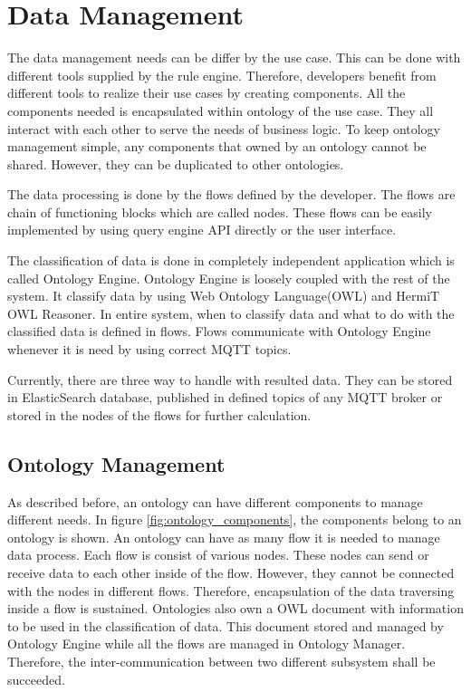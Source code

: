 \chapter{Data Management}\label{chapter:data_management}


The data management needs can be differ by the use case. This can be done with different tools supplied by the rule engine. Therefore, developers benefit from different tools to realize their use cases by creating components. All the components needed is encapsulated within ontology of the use case. They all interact with each other to serve the needs of business logic. To keep ontology management simple, any components that owned by an ontology cannot be shared. However, they can be duplicated to other ontologies.

The data processing is done by the flows defined by the developer. The flows are chain of functioning blocks which are called nodes. These flows can be easily implemented by using query engine API directly or the user interface. 

The classification of data is done in completely independent application which is called Ontology Engine. Ontology Engine is loosely coupled with the rest of the system. It classify data by using Web Ontology Language(OWL) and HermiT OWL Reasoner. In entire system, when to classify data and what to do with the classified data is defined in flows. Flows communicate with Ontology Engine whenever it is need by using correct MQTT topics.

Currently, there are three way to handle with resulted data. They can be stored in ElasticSearch database, published in defined topics of any MQTT broker or stored in the nodes of the flows for further calculation.

\section{Ontology Management}

As described before, an ontology can have different components to manage different needs. In figure \ref{fig:ontology_components}, the components belong to an ontology is shown. An ontology can have as many flow it is needed to manage data process. Each flow is consist of various nodes. These nodes can send or receive data to each other inside of the flow. However, they cannot be connected with the nodes in different flows. Therefore, encapsulation of the data traversing inside a flow is sustained. Ontologies also own a OWL document with information to be used in the classification of data. This document stored and managed by Ontology Engine while all the flows are managed in Ontology Manager. Therefore, the inter-communication between two different subsystem shall be succeeded. 


